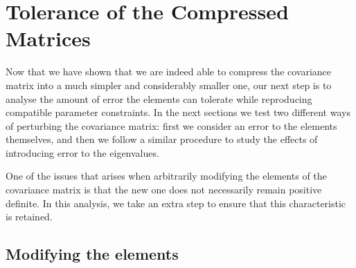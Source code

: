 \documentclass[twocolumn]{\docclass}
\def\bea{\begin{eqnarray}}
\def\eea{\end{eqnarray}}
\begin{document}
	\section{Tolerance of the Compressed Matrices}
	\label{sec:tolerance}
	
	Now that we have shown that we are indeed able to compress the covariance matrix into a much simpler and considerably smaller one, our next step is to analyse the amount of error the elements can tolerate while reproducing compatible parameter constraints. In the next sections we test two different ways of perturbing the covariance matrix: first we consider an error to the elements themselves, and then we follow a similar procedure to study the effects of introducing error to the eigenvalues.

%	
	
	One of the issues that arises when arbitrarily modifying the elements of the covariance matrix is that the new one does not necessarily remain positive definite. In this analysis, we take an extra step to ensure that this characteristic is retained.
	
	\subsection{Modifying the elements}
	
\end{document}
